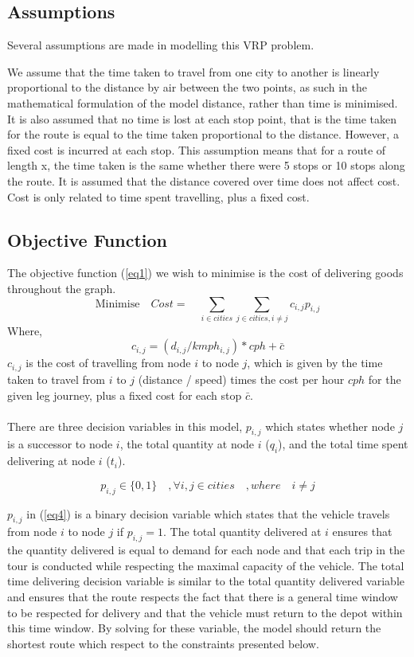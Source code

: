 \documentclass[a4paper,11pt]{article}
\begin{document}
\subsection{Assumptions}
Several assumptions are made in modelling this VRP problem.

We assume that the time taken to travel from one city to another is linearly proportional to the distance by air between the two points, as such in the mathematical formulation of the model distance, rather than time is minimised. It is also assumed that no time is lost at each stop point, that is the time taken for the route is equal to the time taken proportional to the distance. However, a fixed cost is incurred at each stop. This assumption means that for a route of length x, the time taken is the same whether there were 5 stops or 10 stops along the route. It is assumed that the distance covered over time does not affect cost. Cost is only related to time spent travelling, plus a fixed cost.


\subsection{Objective Function}

The objective function (\ref{eq1}) we wish to minimise is the cost of delivering goods throughout the graph.
\begin{equation}\label{eq1}
\textrm{Minimise}\quad  Cost = \quad \sum\limits_{i \in cities} \sum\limits_{j \in cities, i \neq j} c_{i,j}p_{i,j}
\end{equation}
Where, $$c_{i,j} = (d_{i,j}/kmph_{i,j})*cph + \bar{c}$$
$c_{i,j}$ is the cost of travelling from node $i$ to node $j$, which is given by the time taken to travel from $i$ to $j$ (distance / speed) times the cost per hour $cph$ for the given leg journey, plus a fixed cost for each stop $\bar{c}$. 
\\\\
There are three decision variables in this model, $p_{i,j}$ which states whether node $j$ is a successor to node $i$, the total quantity at node $i$ ($q_{i}$), and the total time spent delivering at node $i$ ($t_{i}$).

\begin{equation}\label{eq4}
p_{i,j} \in{\{0,1\}} \quad , \forall i,j \in cities\quad, where \quad i \neq j
\end{equation}

$p_{i,j}$ in (\ref{eq4}) is a binary decision variable which states that the vehicle travels from node $i$ to node $j$ if $p_{i,j}=1$. The total quantity delivered at $i$ ensures that the quantity delivered is equal to demand for each node and that each trip in the tour is conducted while respecting the maximal capacity of the vehicle. The total time delivering decision variable is similar to the total quantity delivered variable and ensures that the route respects the fact that there is a general time window to be respected for delivery and that the vehicle must return to the depot within this time window. By solving for these variable, the model should return the shortest route which respect to the constraints presented below.
\end{document}
